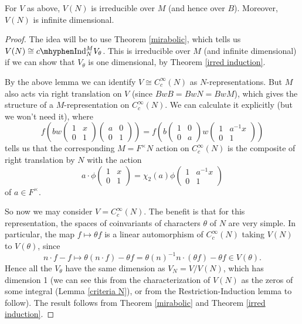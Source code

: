 \begin{prop}
    For $V$ as above, $V(N)$ is irreducible over $M$ (and hence over $B$). Moreover, $V(N)$ is infinite dimensional.
\end{prop}
\begin{proof}
    The idea will be to use Theorem \ref{mirabolic}, which tells us $V(N) \cong \cInd_N^M V_\theta$. This is irreducible over $M$ (and infinite dimensional) if we can show that $V_\theta$ is one dimensional, by Theorem \ref{irred induction}.

    By the above lemma we can identify $V \cong C_c^\infty(N)$ as $N$-representations. But $M$ also acts via right translation on $V$ (since $BwB=BwN=BwM$), which gives the structure of a $M$-representation on $C_c^\infty(N)$. We can calculate it explicitly (but we won't need it), where
    $$f\left(bw\begin{pmatrix}
        1&x\\0&1
    \end{pmatrix}\begin{pmatrix}
        a&0\\0&1
    \end{pmatrix}\right) = f\left(b \begin{pmatrix}
        1&0\\0&a
    \end{pmatrix}w\begin{pmatrix}
        1&a^{-1}x\\0&1
    \end{pmatrix}\right)$$
    tells us that the corresponding $M=F^\times N$ action on $C_c^\infty(N)$ is the composite of right translation by $N$ with the action 
    $$a\cdot \phi \begin{pmatrix}
        1&x\\0&1
    \end{pmatrix} = \chi_2(a) \phi \begin{pmatrix}
        1&a^{-1}x \\ 0&1
    \end{pmatrix}$$ of $a \in F^\times$.

    So now we may consider $V=C_c^\infty(N)$. The benefit is that for this representation, the spaces of coinvariants of characters $\theta$ of $N$ are very simple. In particular, the map $f \mapsto \theta f$ is a linear automorphism of $C_c^\infty(N)$ taking $V(N)$ to $V(\theta)$, since $$n \cdot f - f \mapsto \theta (n \cdot f) - \theta f = \theta(n)^{-1} n \cdot (\theta f) - \theta f \in V(\theta).$$
    Hence all the $V_\theta$ have the same dimension as $V_N=V/V(N)$, which has dimension 1 (we can see this from the characterization of $V(N)$ as the zeros of some integral (Lemma \ref{criteria N}), or from the Restriction-Induction lemma to follow). The result follows from Theorem \ref{mirabolic} and Theorem \ref{irred induction}.
\end{proof}

